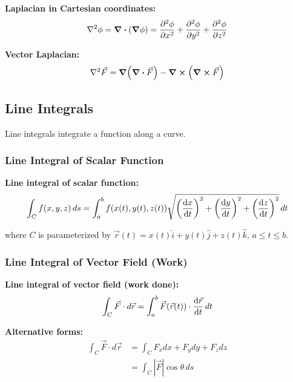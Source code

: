 \documentclass[12pt,a4paper]{article}
\begin{document}
\begin{formulabox}
\textbf{Laplacian in Cartesian coordinates:}
\begin{equation}
\laplacian \phi = \div(\grad\phi) = \pdv[2]{\phi}{x} + \pdv[2]{\phi}{y} + \pdv[2]{\phi}{z}
\end{equation}

\textbf{Vector Laplacian:}
\begin{equation}
\laplacian \vec{F} = \grad(\div\vec{F}) - \curl(\curl\vec{F})
\end{equation}
\end{formulabox}

\subsection{Line Integrals}
Line integrals integrate a function along a curve.

\subsubsection{Line Integral of Scalar Function}
\begin{formulabox}
\textbf{Line integral of scalar function:}
\begin{equation}
\int_C f(x,y,z) \, ds = \int_a^b f(x(t), y(t), z(t)) \sqrt{\left(\dv{x}{t}\right)^2 + \left(\dv{y}{t}\right)^2 + \left(\dv{z}{t}\right)^2} \, dt
\end{equation}

where $C$ is parameterized by $\vec{r}(t) = x(t)\hat{i} + y(t)\hat{j} + z(t)\hat{k}$, $a \leq t \leq b$.
\end{formulabox}

\subsubsection{Line Integral of Vector Field (Work)}
\begin{formulabox}
\textbf{Line integral of vector field (work done):}
\begin{equation}
\int_C \vec{F} \cdot d\vec{r} = \int_a^b \vec{F}(\vec{r}(t)) \cdot \dv{\vec{r}}{t} \, dt
\end{equation}

\textbf{Alternative forms:}
\begin{align}
\int_C \vec{F} \cdot d\vec{r} &= \int_C F_x dx + F_y dy + F_z dz \\
&= \int_C |\vec{F}| \cos\theta \, ds
\end{align}
\end{formulabox}
\end{document}
